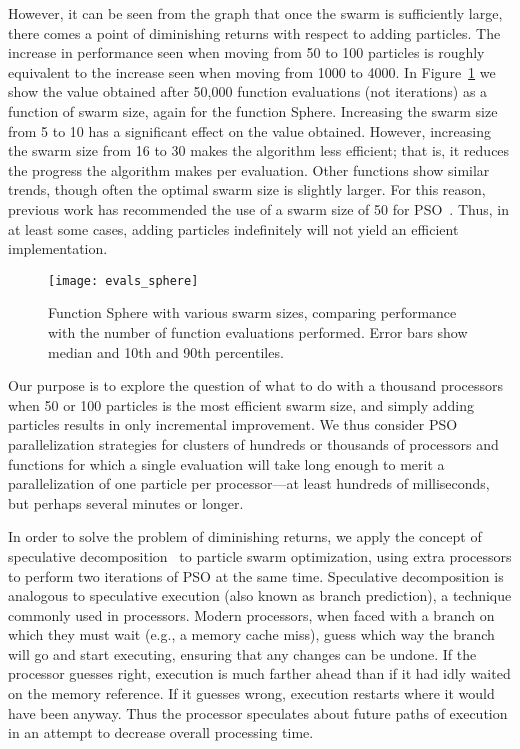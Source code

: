 \documentclass[smallcondensed]{svjour3}
\newcommand{\fig}[1]{Figure~\ref{fig:#1}}
\begin{document}
However, it can be seen from the graph that once the swarm is sufficiently
large, there comes a point of diminishing returns with respect to adding
particles.  The increase in performance seen when moving from 50 to 100
particles is roughly equivalent to the increase seen when moving from 1000 to
4000.  In \fig{evals-sphere} we show the value obtained after 50,000 function
evaluations (not iterations) as a function of swarm size, again for the
function Sphere.  Increasing the swarm size from 5 to 10 has a significant
effect on the value obtained.  However, increasing the swarm size from 16 to 30
makes the algorithm less efficient; that is, it reduces the progress the
algorithm makes per evaluation.  Other functions show similar trends, though
often the optimal swarm size is slightly larger.  For this reason, previous
work has recommended the use of a swarm size of 50 for
PSO~\citep{bratton-2007-defining-a-standard-for-pso}.  Thus, in at least some
cases, adding particles indefinitely will not yield an efficient
implementation.

\begin{figure}
  \centering
  \texttt{[image: evals\_sphere]}
  \caption{Function Sphere with various swarm sizes, comparing performance with
  the number of function evaluations performed.  Error bars show median and
  10th and 90th percentiles.}
  \label{fig:evals-sphere}
\end{figure}

Our purpose is to explore the question of what to do with a thousand processors
when 50 or 100 particles is the most efficient swarm size, and simply adding
particles results in only incremental improvement.  We thus consider PSO
parallelization strategies for clusters of hundreds or thousands of processors
and functions for which a single evaluation will take long enough to merit a
parallelization of one particle per processor---at least hundreds of
milliseconds, but perhaps several minutes or longer.

In order to solve the problem of diminishing returns, we apply the concept of
speculative decomposition~\citep{grama-2003-intro-to-parallel-computing} to
particle swarm optimization, using extra processors to perform two iterations
of PSO at the same time.  Speculative decomposition is analogous to speculative
execution (also known as branch prediction), a technique commonly used in
processors.  Modern processors, when faced with a branch on which they must
wait (e.g., a memory cache miss), guess which way the branch will go and start
executing, ensuring that any changes can be undone.  If the processor guesses
right, execution is much farther ahead than if it had idly waited on the memory
reference.  If it guesses wrong, execution restarts where it would have been
anyway.  Thus the processor speculates about future paths of execution in an
attempt to decrease overall processing time.
\end{document}
